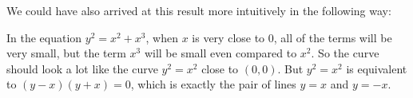 \documentclass{ximera}
\begin{document}
\begin{exercise}
We could have also arrived at this result more intuitively in the following way:

In the equation $y^2 = x^2+x^3$, when $x$ is very close to $0$, all of
the terms will be very small, but the term $x^3$ will be small even
compared to $x^2$.  So the curve should look a lot like the curve $y^2
= x^2$ close to $(0,0)$.  But $y^2 = x^2$ is equivalent to
$(y-x)(y+x)=0$, which is exactly the pair of lines $y=x$ and $y=-x$.
\end{exercise}
\end{document}
